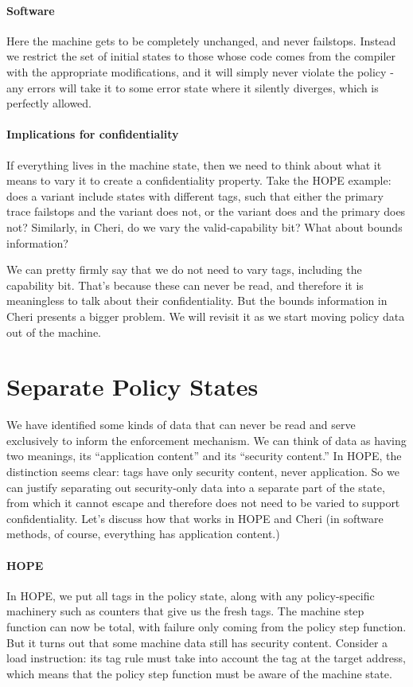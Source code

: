 \documentclass{article}
\begin{document}
\paragraph*{Software} Here the machine gets to be completely unchanged, and never failstops.
Instead we restrict the set of initial states to those whose code comes from the compiler
with the appropriate modifications, and it will simply never violate the policy - any errors
will take it to some error state where it silently diverges, which is perfectly allowed.

\paragraph*{Implications for confidentiality} If everything lives in the machine state, then
we need to think about what it means to vary it to create a confidentiality property. Take
the HOPE example: does a variant include states with different tags, such that either the
primary trace failstops and the variant does not, or the variant does and the primary does
not? Similarly, in Cheri, do we vary the valid-capability bit? What about bounds information?

We can pretty firmly say that we do not need to vary tags, including the capability bit. That's
because these can never be read, and therefore it is meaningless to talk about their
confidentiality. But the bounds information in Cheri presents a bigger problem. We will
revisit it as we start moving policy data out of the machine.

\section{Separate Policy States}

We have identified some kinds of data that can never be read and serve exclusively to inform
the enforcement mechanism. We can think of data as having two meanings, its ``application
content'' and its ``security content.'' In HOPE, the distinction seems clear: tags have only
security content, never application. So we can justify separating out security-only data
into a separate part of the state, from which it cannot escape and therefore does not need
to be varied to support confidentiality. Let's discuss how that works in HOPE and Cheri
(in software methods, of course, everything has application content.)

\paragraph*{HOPE} In HOPE, we put all tags in the policy state, along with any policy-specific
machinery such as counters that give us the fresh tags. The machine step function can now be
total, with failure only coming from the policy step function. But it turns out that some
machine data still has security content. Consider a load instruction: its tag rule must
take into account the tag at the target address, which means that the policy step function
must be aware of the machine state.
\end{document}

